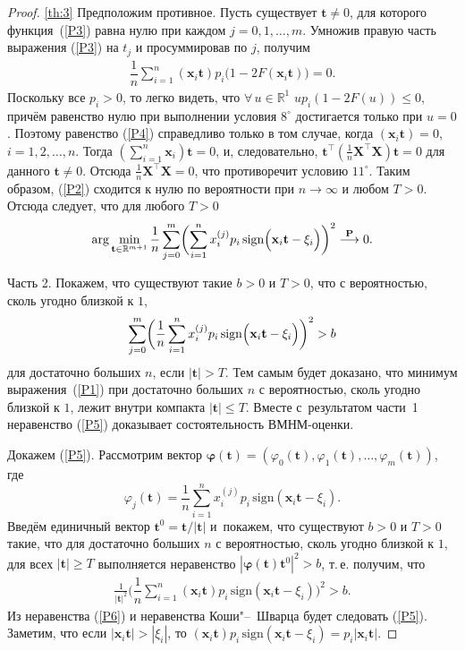 \begin{proof}{\ref{th:3}}
Предположим противное. Пусть существует $\mathbf{t} \neq 0$, для
которого функция~(\ref{P3}) равна нулю при каждом
$j = 0, 1, \ldots, m$. 
Умножив правую часть выражения (\ref{P3}) на $t_{j}$ и просуммировав по $j$, получим
\begin{gather} \label{P4}
\dfrac 1n\sum_{i=1}^n
(\mathbf{x}_{i}\mathbf{t})p_{i}\bigl(1-2F(\mathbf{x}_{i}\mathbf{t})\bigr)=0.
\end{gather}
Поскольку все $p_{i}>0$, то легко видеть, что $\forall \, u \in
\mathbb{R}^{1}$ $u p_{i} (1-2F(u)) \leq 0$, причём равенство нулю
при выполнении условия $8^{\circ}$ достигается только при $u=0$.
Поэтому равенство (\ref{P4}) справедливо только в том случае,
когда $(\mathbf{x}_{i}\mathbf{t})=0$, $i= 1, 2, \ldots, n$. Тогда
$(\sum_{i=1}^n \mathbf{x}_{i})\mathbf{t}=0$, и, следовательно,
$\mathbf{t}^{\top}\left(\frac
1n\mathbf{X}^{\top}\mathbf{X}\right)\mathbf{t}=0$ для данного
$\mathbf{t} \neq 0$. Отсюда $\frac 1n\mathbf{X}^{\top}\mathbf{X}=0$,
что противоречит условию $11^{\circ}$. Таким образом, (\ref{P2})
сходится к нулю по вероятности при $n \rightarrow \infty$ и любом
$T>0$. Отсюда следует, что для любого $T>0$ 
$$
\arg\min_{\mathbf{t}
\in \mathbb{R}^{m+1}} \dfrac 1n \sum_{j=0}^m 
\biggl(\sum_{i=1}^n
x_{i}^{(j)}p_{i} \,
\mathrm{sign}\Bigl(\mathbf{x}_{i}\mathbf{t}-\xi_{i}\Bigr)\biggr)^{2}\stackrel{\mathbf{P}}{\longrightarrow}0.$$

Часть 2. Покажем, что существуют такие $b>0$ и $T>0$, что с
вероятностью, сколь угодно близкой к $1$,
\begin{gather} \label{P5}
\sum_{j=0}^m \biggl(\dfrac 1n \sum_{i=1}^n x_{i}^{(j)}p_{i} \,
\mathrm{sign}\Bigl(\mathbf{x}_{i}\mathbf{t}-\xi_{i}\Bigr)\biggr)^{2}>b
\end{gather}
для достаточно больших $n$, если $|\mathbf{t}|>T$. 
Тем самым будет доказано, что минимум выражения~(\ref{P1}) при достаточно больших $n$ с вероятностью, сколь угодно близкой к $1$, лежит внутри компакта $|\mathbf{t}| \leq T$. 
Вместе с~результатом части~1  неравенство (\ref{P5}) доказывает состоятельность ВМНМ-оценки.

Докажем (\ref{P5}). Рассмотрим вектор
$\mathbf{\varphi}(\mathbf{t})=(\varphi_{0}(\mathbf{t}), \varphi_{1}(\mathbf{t}), \ldots,
\varphi_{m}(\mathbf{t}))$, где $$\varphi_{j}(\mathbf{t}) = \dfrac
1n\sum_{i=1}^n x_{i}^{(j)}p_{i} \,
\mathrm{sign}\left(\mathbf{x}_{i}\mathbf{t}-\xi_{i}\right).$$
Введём единичный вектор $\mathbf{t}^{0}=\mathbf{t}/|\mathbf{t}|$ и~покажем, что существуют $b>0$ и $T>0$ такие, что для достаточно
больших $n$ с вероятностью, сколь угодно близкой к $1$, для всех $|\mathbf{t}| \geq T$ выполняется неравенство
$|\mathbf{\varphi}(\mathbf{t})\mathbf{t}^{0}|^{2}>b$, т.\,е.
получим, что
\begin{gather} \label{P6}
\frac{1}{|\mathbf{t}|^{2}} \biggl(\dfrac 1n \sum_{i=1}^n
(\mathbf{x}_{i}\mathbf{t})p_{i} \,
\mathrm{sign}\left(\mathbf{x}_{i}\mathbf{t}-\xi_{i}\right)\biggr)^{2}>b.
\end{gather}
Из неравенства (\ref{P6}) и неравенства Коши"--~Шварца будет следовать (\ref{P5}). 
Заметим, что если $|\mathbf{x}_{i}\mathbf{t}|>|\xi_{i}|$, то
$(\mathbf{x}_{i}\mathbf{t})p_{i} \,
\mathrm{sign}\left(\mathbf{x}_{i}\mathbf{t}-\xi_{i}\right) =
p_{i}|\mathbf{x}_{i}\mathbf{t}|$.


\end{proof}
